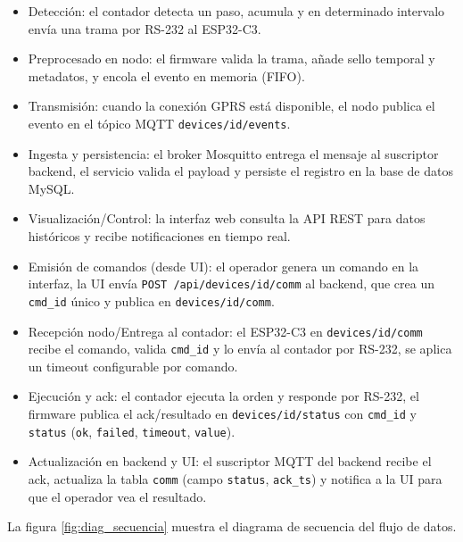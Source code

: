 \begin{itemize}

  \item Detección: el contador detecta un paso, acumula y en determinado intervalo envía una trama por RS-232 al ESP32-C3.

  \item Preprocesado en nodo: el firmware valida la trama, añade sello temporal y metadatos, y encola el evento en memoria (FIFO).

  \item Transmisión: cuando la conexión GPRS está disponible, el nodo publica el evento en el tópico MQTT \texttt{devices/{id}/events}.
  
  \item Ingesta y persistencia: el broker Mosquitto entrega el mensaje al suscriptor backend, el servicio valida el payload y persiste el registro en la base de datos MySQL.
  
  \item Visualización/Control: la interfaz web consulta la API REST para datos históricos y recibe notificaciones en tiempo real.
  
  \item Emisión de comandos (desde UI): el operador genera un comando en la interfaz, la UI envía
  \texttt{POST /api/devices/{id}/comm} al backend, que crea un \texttt{cmd\_id} único y publica en \texttt{devices/{id}/comm}.
  
  \item Recepción nodo/Entrega al contador: el ESP32-C3 en \texttt{devices/{id}/comm} recibe el comando, valida \texttt{cmd\_id} y lo envía al contador por RS-232, se aplica un timeout configurable por comando.
  
  \item Ejecución y ack: el contador ejecuta la orden y responde por RS-232, el firmware publica el ack/resultado en \texttt{devices/{id}/status} con \texttt{cmd\_id} y \texttt{status} (\texttt{ok}, \texttt{failed}, \texttt{timeout}, \texttt{value}).

  \item Actualización en backend y UI: el suscriptor MQTT del backend recibe el ack, actualiza la tabla \texttt{comm} (campo \texttt{status}, \texttt{ack\_ts}) y notifica a la UI para que el operador vea el resultado.
\end{itemize}


La figura \ref{fig:diag_secuencia} muestra el diagrama de secuencia del flujo de datos.

